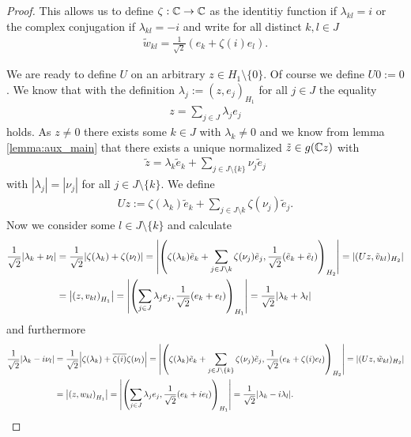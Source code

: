 \begin{proof}
	This allows us to define $\zeta: \mathbb{C} \to \mathbb{C}$ as the identitiy function if $\lambda_{kl} = i$ or the complex conjugation if $\lambda_{kl} = -i$ and write for all distinct $k,l \in J$ 
	\begin{align*}
		\tilde{w}_{kl} = \frac{1}{\sqrt{2}}(e_k + \zeta(i) e_l).
	\end{align*}
	
	We are ready to define $U$ on an arbitrary $z \in H_1 \setminus \{0\}$. Of course we define $U0 := 0$.  We know that with the definition $\lambda_j := (z,e_j)_{H_1}$ for all $j \in J$ the equality
	\begin{align*}
		z = \sum_{j \in J} \lambda_j e_j
	\end{align*}
	holds. As $z \neq 0$ there exists some $k \in J$ with $\lambda_k \neq 0$ and we know from lemma \ref{lemma:aux_main} that there exists a unique normalized $\tilde{z} \in g(\mathbb{C} z)$ with
	\begin{align*}
		\tilde{z} = \lambda_k \tilde{e}_k + \sum_{j \in J \setminus \{k\}} \nu_j \tilde{e}_j
	\end{align*} 
	with $|\lambda_j| = |\nu_j|$ for all $j \in J \setminus \{k\}$. We define
	\begin{align*}
		Uz := \zeta(\lambda_k) \tilde{e}_k + \sum_{j \in J \setminus{k}} \zeta(\nu_j) \tilde{e}_j.
	\end{align*}
	Now we consider some $l \in J \setminus \{k\}$ and calculate
	\begin{align*}
		\frac{1}{\sqrt{2}}{\left | \lambda_k + \nu_l \right |} &= \frac{1}{\sqrt{2}} {\left | \zeta(\lambda_k) + \zeta(\nu_l) \right |} = {\left | {\left ( \zeta(\lambda_k) \tilde{e}_k + \sum_{j \in J \setminus{k}} \zeta(\nu_j) \tilde{e}_j, \frac{1}{\sqrt{2}}(\tilde{e}_k + \tilde{e}_l) \right )}_{H_2} \right |} = |(Uz, \tilde{v}_{kl})_{H_2}| \\
		&= {\left | {\left ( z, v_{kl} \right )}_{H_1} \right |} = {\left | {\left ( \sum_{j \in J} \lambda_j e_j, \frac{1}{\sqrt{2}}(e_k + e_l) \right )}_{H_1} \right |} = \frac{1}{\sqrt{2}} {\left | \lambda_k + \lambda_l \right |} 
	\end{align*}
	and furthermore
	\begin{align*}
		\frac{1}{\sqrt{2}}\vbraces{\lambda_k - i \nu_l} &= \frac{1}{\sqrt{2}} \vbraces{\zeta(\lambda_k) + \overline{\zeta(i)} \zeta(\nu_l)} = \vbraces{\pbraces{\zeta(\lambda_k) \tilde{e}_k + \sum_{j \in J \setminus \{k\}} \zeta(\nu_j) \tilde{e}_j, \frac{1}{\sqrt{2}}(e_k + \zeta(i) e_l)}_{H_2}} = |(Uz, \tilde{w}_{kl})_{H_2}| \\
		&= \vbraces{\pbraces{z, w_{kl}}_{H_1}} = \vbraces{\pbraces{\sum_{j \in J} \lambda_j e_j, \frac{1}{\sqrt{2}}(e_k + ie_l)}_{H_1}} = \frac{1}{\sqrt{2}} \vbraces{\lambda_k - i \lambda_l}.

\end{align*}
\end{proof}
